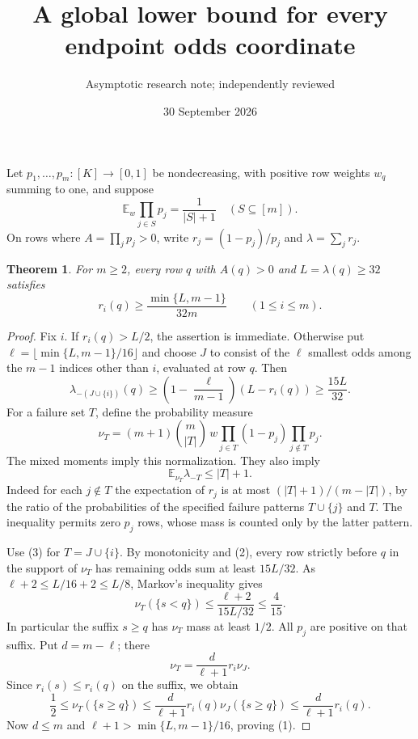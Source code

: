 \documentclass[11pt]{article}
\title{A global lower bound for every endpoint odds coordinate}
\author{Asymptotic research note; independently reviewed}
\date{30 September 2026}
\newtheorem{theorem}{Theorem}
\newcommand{\E}{\mathbb E}
\begin{document}
\maketitle
Let $p_1,\ldots,p_m:[K]\to[0,1]$ be nondecreasing, with positive row
weights $w_q$ summing to one, and suppose
\[
 \E_w\prod_{j\in S}p_j=\frac1{|S|+1}\quad(S\subseteq[m]).
\]
On rows where $A=\prod_jp_j>0$, write $r_j=(1-p_j)/p_j$ and
$\lambda=\sum_jr_j$.

\begin{theorem}
For $m\ge2$, every row $q$ with $A(q)>0$ and $L=\lambda(q)\ge32$
satisfies
\[
 r_i(q)\ge\frac{\min\{L,m-1\}}{32m}\qquad(1\le i\le m).
\tag{1}
\]
\end{theorem}
\begin{proof}
Fix $i$. If $r_i(q)>L/2$, the assertion is immediate. Otherwise put
$\ell=\lfloor\min\{L,m-1\}/16\rfloor$ and choose $J$ to consist of the
$\ell$ smallest odds among the $m-1$ indices other than $i$, evaluated
at row $q$. Then
\[
 \lambda_{-(J\cup\{i\})}(q)
 \ge\left(1-\frac\ell{m-1}\right)(L-r_i(q))
 \ge\frac{15L}{32}.
\tag{2}
\]
For a failure set $T$, define the probability measure
\[
 \nu_T=(m+1)\binom m{|T|}\,w
       \prod_{j\in T}(1-p_j)\prod_{j\notin T}p_j.
\]
The mixed moments imply this normalization. They also imply
\[
 \E_{\nu_T}\lambda_{-T}\le |T|+1.
\tag{3}
\]
Indeed for each $j\notin T$ the expectation of $r_j$ is at most
$(|T|+1)/(m-|T|)$, by the ratio of the probabilities of the specified
failure patterns $T\cup\{j\}$ and $T$. The inequality permits zero
$p_j$ rows, whose mass is counted only by the latter pattern.

Use (3) for $T=J\cup\{i\}$. By monotonicity and (2), every row strictly
before $q$ in the support of $\nu_T$ has remaining odds sum at least
$15L/32$. As $\ell+2\le L/16+2\le L/8$, Markov's inequality gives
\[
 \nu_T(\{s<q\})\le\frac{\ell+2}{15L/32}\le\frac4{15}.
\]
In particular the suffix $s\ge q$ has $\nu_T$ mass at least $1/2$.
All $p_j$ are positive on that suffix. Put $d=m-\ell$; there
\[
 \nu_T=\frac d{\ell+1}r_i\nu_J.
\]
Since $r_i(s)\le r_i(q)$ on the suffix, we obtain
\[
 \frac12\le\nu_T(\{s\ge q\})
 \le\frac d{\ell+1}r_i(q)\nu_J(\{s\ge q\})
 \le\frac d{\ell+1}r_i(q).
\]
Now $d\le m$ and $\ell+1>\min\{L,m-1\}/16$, proving (1).
\end{proof}
\end{document}
